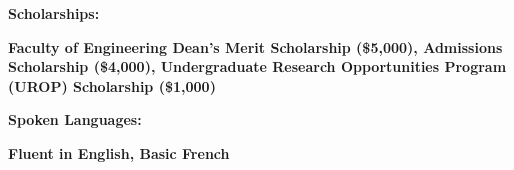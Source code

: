 \documentclass[]{resume-openfont}
\begin{document}
\textbf{Scholarships:}
\begin{bullets}
    \item \textbf{{Faculty of Engineering Dean’s Merit Scholarship (\$5,000), Admissions Scholarship (\$4,000), Undergraduate Research Opportunities Program (UROP) Scholarship (\$1,000)}}
\end{bullets}

\textbf{Spoken Languages:}
\begin{bullets}
    \item \textbf{{Fluent in English, Basic French}}
\end{bullets}


\end{document}

